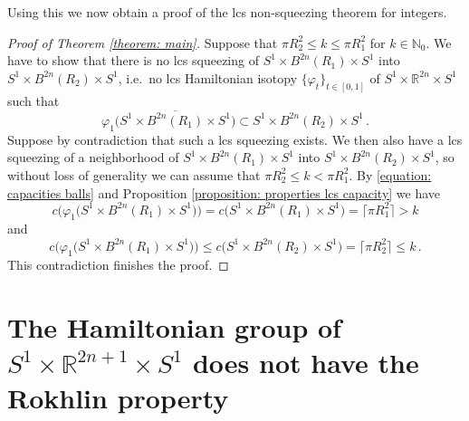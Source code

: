 \documentclass{amsart}
\theoremstyle{remark}
\begin{document}
Using this we now obtain a proof
of the lcs non-squeezing theorem for integers.

\begin{proof}[Proof of Theorem \ref{theorem: main}]
Suppose that $\pi R_2^2 \leq k \leq \pi R_1^2$ for $k \in \mathbb{N}_0$.
We have to show that there is no lcs squeezing
of $S^1 \times B^{2n}(R_1) \times S^1$
into $S^1 \times B^{2n}(R_2) \times S^1$,
i.e.\ no lcs Hamiltonian isotopy $\{\varphi_t\}_{t \in [0,1]}$
of $S^1 \times \mathbb{R}^{2n} \times S^1$
such that
\[
\varphi_1 \big(\overline{S^1 \times B^{2n}(R_1) \times S^1}\big)
\subset S^1 \times B^{2n}(R_2) \times S^1 \,.
\]
Suppose by contradiction that
such a lcs squeezing exists.
We then also have a lcs squeezing
of a neighborhood of $S^1 \times B^{2n}(R_1) \times S^1$
into $S^1 \times B^{2n}(R_2) \times S^1$,
so without loss of generality
we can assume that $\pi R_2^2 \leq k < \pi R_1^2$.
By \eqref{equation: capacities balls}
and Proposition \ref{proposition: properties lcs capacity}
we have
\[
c \Big( \varphi_1 \big(S^1 \times B^{2n}(R_1) \times S^1\big) \Big)
= c \big(S^1 \times B^{2n}(R_1) \times S^1\big)
= \lceil \pi R_1^2 \rceil > k
\]
and
\[
c \Big( \varphi_1 \big(S^1 \times B^{2n}(R_1) \times S^1\big) \Big)
\leq c \big(S^1 \times B^{2n}(R_2) \times S^1\big)
= \lceil \pi R_2^2 \rceil \leq k\,.
\]
This contradiction finishes the proof.
\end{proof}




\section{The Hamiltonian group of $S^1 \times \mathbb{R}^{2n+1} \times S^1$
does not have the Rokhlin property}\label{section: Rokhlin}
\end{document}
